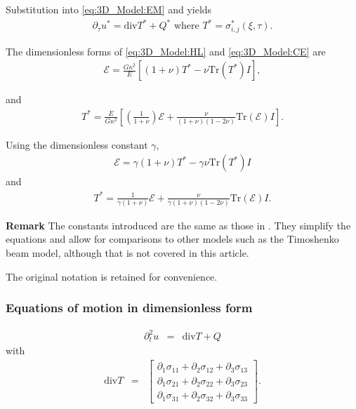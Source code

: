 Substitution into \eqref{eq:3D_Model:EM} and yields
\begin{eqnarray*}
	\partial_{\tau} u^{*} = \textrm{div}T^* + Q^* \textrm{ where } T^* = \sigma_{i,j}^*(\xi,\tau).
\end{eqnarray*}

The dimensionless forms of \eqref{eq:3D_Model:HL} and \eqref{eq:3D_Model:CE} are
\begin{eqnarray*}
	\mathcal{E} = \frac{G \kappa^2}{E} \left[ (1+\nu)T^* - \nu \textrm{Tr}(T^*)I \right],
\end{eqnarray*}\label{sym:I}

and
\begin{eqnarray*}
	T^* = \frac{E}{G \kappa^2} \left[\left( \frac{1}{1+\nu} \right)\mathcal{E} + \frac{\nu}{(1+\nu)(1-2\nu)}\textrm{Tr}(\mathcal{E})I \right].
\end{eqnarray*}

Using the dimensionless constant $\gamma$,
\begin{eqnarray}
	\mathcal{E} = \gamma(1+\nu)T^* - \gamma\nu \textrm{Tr}(T^*)I \label{DM_H_E}
\end{eqnarray}
and
\begin{eqnarray}
	T^* = \frac{1}{\gamma(1+\nu)}\mathcal{E} + \frac{\nu}{\gamma(1+\nu)(1-2\nu)}\textrm{Tr}(\mathcal{E})I. \label{DM_H_T}
\end{eqnarray}

\textbf{Remark} The constants introduced are the same as those in \cite{LVV09}. They simplify the equations and allow for comparisons to other models such as the Timoshenko beam model, although that is not covered in this article.

The original notation is retained for convenience.

\subsubsection*{Equations of motion in dimensionless form}\label{sssec:3D_Model:EquationOfMotionDimensionless}
\begin{eqnarray}
	\partial_t^2 u & = & \textrm{div}T + Q \label{eq:3D_Model:EM-D}
\end{eqnarray}
with
\begin{eqnarray}
	\textrm{div}  T & = &
	\begin{bmatrix}
		\partial_1 \sigma_{11} + \partial_2 \sigma_{12} + \partial_3 \sigma_{13} \\
		\partial_1 \sigma_{21} + \partial_2 \sigma_{22} + \partial_3 \sigma_{23} \\
		\partial_1 \sigma_{31} + \partial_2 \sigma_{32} + \partial_3 \sigma_{33}
	\end{bmatrix}.\label{eq:3D_Model:divT-D}
\end{eqnarray}

